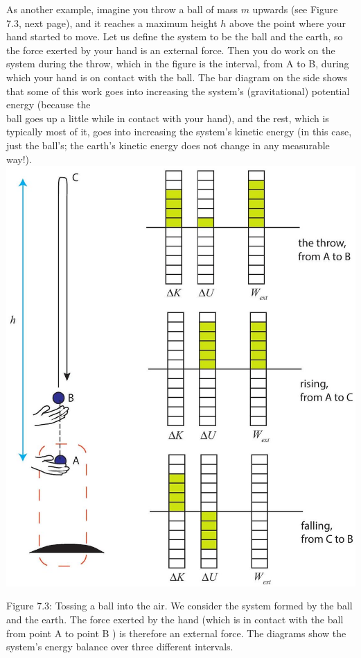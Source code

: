 \documentclass[10pt]{article}
\begin{document}
As another example, imagine you throw a ball of mass $m$ upwards (see Figure 7.3, next page), and it reaches a maximum height $h$ above the point where your hand started to move. Let us define the system to be the ball and the earth, so the force exerted by your hand is an external force. Then you do work on the system during the throw, which in the figure is the interval, from A to B, during which your hand is on contact with the ball. The bar diagram on the side shows that some of this work goes into increasing the system's (gravitational) potential energy (because the\\
ball goes up a little while in contact with your hand), and the rest, which is typically most of it, goes into increasing the system's kinetic energy (in this case, just the ball's; the earth's kinetic energy does not change in any measurable way!).\\
\includegraphics[max width=\textwidth, center]{2024_09_14_9969b06773f10b6936e8g-163}

Figure 7.3: Tossing a ball into the air. We consider the system formed by the ball and the earth. The force exerted by the hand (which is in contact with the ball from point A to point B ) is therefore an external force. The diagrams show the system's energy balance over three different intervals.
\end{document}

